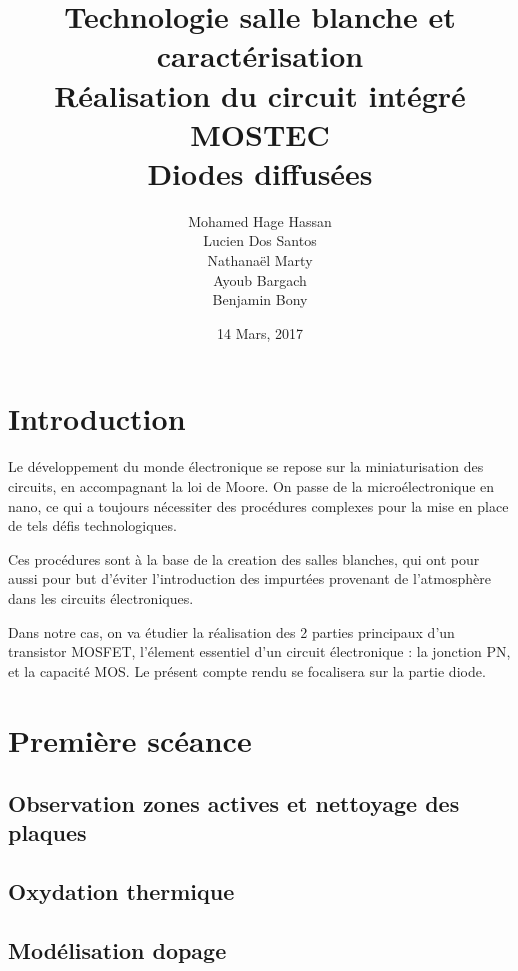 \documentclass[11pt]{article}
\begin{document}
\title{\textbf{Technologie salle blanche et caract\'erisation}\\ R\'ealisation du circuit int\'egr\'e MOSTEC \\ Diodes diffus\'ees}
\author{Mohamed Hage Hassan \\ Lucien Dos Santos \\ Nathanaël Marty \\ Ayoub Bargach \\ Benjamin Bony}
\date{14 Mars, 2017}
\maketitle

\tableofcontents
\clearpage

\section{Introduction}
Le d\'eveloppement du monde \'electronique se repose sur la miniaturisation des circuits, en accompagnant la loi de Moore. On passe de la micro\'electronique en nano, ce qui a toujours n\'ecessiter des proc\'edures complexes pour la mise en place de tels d\'efis technologiques. 

Ces proc\'edures sont \`a la base de la creation des salles blanches, qui ont pour aussi pour but d'\'eviter l'introduction des impurt\'ees provenant de l'atmosph\`ere dans les circuits \'electroniques.

Dans notre cas, on va \'etudier la r\'ealisation des 2 parties principaux d'un transistor MOSFET, l'\'element essentiel d'un circuit \'electronique : la jonction PN, et la capacit\'e MOS. Le pr\'esent compte rendu se focalisera sur la partie diode.

\section{Premi\`ere sc\'eance}

\subsection{Observation zones actives et nettoyage des plaques}

\subsection{Oxydation thermique}

\subsection{Mod\'elisation dopage}
\end{document}
